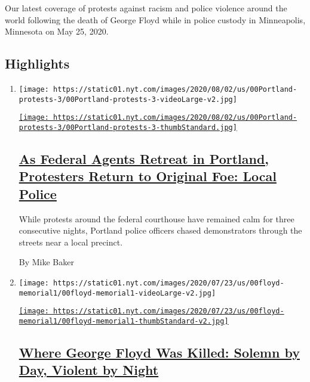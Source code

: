 Our latest coverage of protests against racism and police violence
around the world following the death of George Floyd while in police
custody in Minneapolis, Minnesota on May 25, 2020.

\hypertarget{highlights}{%
\subsection{Highlights}\label{highlights}}

\begin{enumerate}
\def\labelenumi{\arabic{enumi}.}
\item
  \texttt{[image: https://static01.nyt.com/images/2020/08/02/us/00Portland-protests-3/00Portland-protests-3-videoLarge-v2.jpg]}

  \href{/2020/08/02/us/portland-protests-.html}{\texttt{[image: https://static01.nyt.com/images/2020/08/02/us/00Portland-protests-3/00Portland-protests-3-thumbStandard.jpg]}}

  \hypertarget{as-federal-agents-retreat-in-portland-protesters-return-to-original-foe-local-police}{%
  \subsection{\texorpdfstring{\href{/2020/08/02/us/portland-protests-.html}{As
  Federal Agents Retreat in Portland, Protesters Return to Original Foe:
  Local
  Police}}{As Federal Agents Retreat in Portland, Protesters Return to Original Foe: Local Police}}\label{as-federal-agents-retreat-in-portland-protesters-return-to-original-foe-local-police}}

  While protests around the federal courthouse have remained calm for
  three consecutive nights, Portland police officers chased
  demonstrators through the streets near a local precinct.

  By Mike Baker
\item
  \texttt{[image: https://static01.nyt.com/images/2020/07/23/us/00floyd-memorial1/00floyd-memorial1-videoLarge-v2.jpg]}

  \href{/2020/07/29/us/george-floyd-memorial.html}{\texttt{[image: https://static01.nyt.com/images/2020/07/23/us/00floyd-memorial1/00floyd-memorial1-thumbStandard-v2.jpg]}}

  \hypertarget{where-george-floyd-was-killed-solemn-by-day-violent-by-night}{%
  \subsection{\texorpdfstring{\href{/2020/07/29/us/george-floyd-memorial.html}{Where
  George Floyd Was Killed: Solemn by Day, Violent by
  Night}}{Where George Floyd Was Killed: Solemn by Day, Violent by Night}}\label{where-george-floyd-was-killed-solemn-by-day-violent-by-night}}


\end{enumerate}
